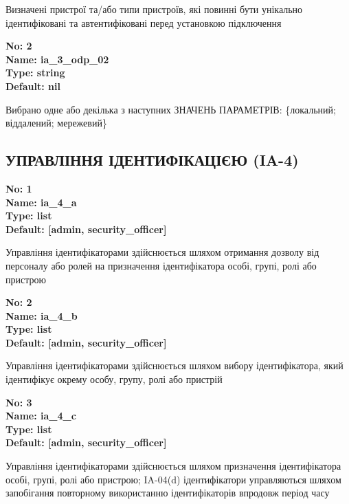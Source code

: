 \documentclass{article}
\begin{document}
{\footnotesize Визначені пристрої та/або типи пристроїв, які повинні бути унікально ідентифіковані та автентифіковані перед установкою підключення}


{\footnotesize\bfseries
No: 2\\
Name: ia\_\allowbreak{}3\_\allowbreak{}odp\_\allowbreak{}02\\
Type: string\\
Default: nil
}

{\footnotesize Вибрано одне або декілька з наступних ЗНАЧЕНЬ ПАРАМЕТРІВ: \{локальний; віддалений; мережевий\}}




\subsection{УПРАВЛІННЯ ІДЕНТИФІКАЦІЄЮ (IA-4)}


\vspace{10pt}
{\footnotesize\bfseries
No: 1\\
Name: ia\_\allowbreak{}4\_\allowbreak{}a\\
Type: list\\
Default: [\textquotedbl{}admin\textquotedbl{}, \textquotedbl{}security\_\allowbreak{}officer\textquotedbl{}]
}

{\footnotesize Управління ідентифікаторами здійснюється шляхом отримання дозволу від персоналу або ролей на призначення ідентифікатора особі, групі, ролі або пристрою}


{\footnotesize\bfseries
No: 2\\
Name: ia\_\allowbreak{}4\_\allowbreak{}b\\
Type: list\\
Default: [\textquotedbl{}admin\textquotedbl{}, \textquotedbl{}security\_\allowbreak{}officer\textquotedbl{}]
}

{\footnotesize Управління ідентифікаторами здійснюється шляхом вибору ідентифікатора, який ідентифікує окрему особу, групу, ролі або пристрій}


{\footnotesize\bfseries
No: 3\\
Name: ia\_\allowbreak{}4\_\allowbreak{}c\\
Type: list\\
Default: [\textquotedbl{}admin\textquotedbl{}, \textquotedbl{}security\_\allowbreak{}officer\textquotedbl{}]
}

{\footnotesize Управління ідентифікаторами здійснюється шляхом призначення ідентифікатора особі, групі, ролі або пристрою; IA-04(d) ідентифікатори управляються шляхом запобігання повторному використанню ідентифікаторів впродовж період часу}
\end{document}
